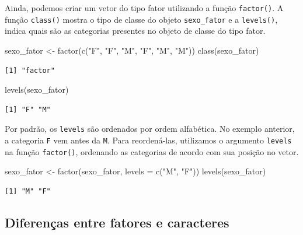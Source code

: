 \documentclass[
  brazilian,
]{book}
\newenvironment{Shaded}{\begin{snugshade}}{\end{snugshade}}
\newcommand{\AttributeTok}[1]{\textcolor[rgb]{0.77,0.63,0.00}{#1}}
\newcommand{\FunctionTok}[1]{\textcolor[rgb]{0.00,0.00,0.00}{#1}}
\newcommand{\NormalTok}[1]{#1}
\newcommand{\OtherTok}[1]{\textcolor[rgb]{0.56,0.35,0.01}{#1}}
\newcommand{\StringTok}[1]{\textcolor[rgb]{0.31,0.60,0.02}{#1}}
\begin{document}
Ainda, podemos criar um vetor do tipo fator utilizando a função \texttt{factor()}. A função \texttt{class()} mostra o tipo de classe do objeto \texttt{sexo\_fator} e a \texttt{levels()}, indica quais são as categorias presentes no objeto de classe do tipo fator.

\begin{Shaded}
\begin{Highlighting}[]
\NormalTok{sexo\_fator }\OtherTok{\textless{}{-}} \FunctionTok{factor}\NormalTok{(}\FunctionTok{c}\NormalTok{(}\StringTok{"F"}\NormalTok{, }\StringTok{"F"}\NormalTok{, }\StringTok{"M"}\NormalTok{, }\StringTok{"F"}\NormalTok{, }\StringTok{"M"}\NormalTok{, }\StringTok{"M"}\NormalTok{))}
\FunctionTok{class}\NormalTok{(sexo\_fator)}
\end{Highlighting}
\end{Shaded}

\begin{verbatim}
[1] "factor"
\end{verbatim}

\begin{Shaded}
\begin{Highlighting}[]
\FunctionTok{levels}\NormalTok{(sexo\_fator)}
\end{Highlighting}
\end{Shaded}

\begin{verbatim}
[1] "F" "M"
\end{verbatim}

Por padrão, os \texttt{levels} são ordenados por ordem alfabética. No exemplo anterior, a categoria \texttt{F} vem antes da \texttt{M}. Para reordená-las, utilizamos o argumento \texttt{levels} na função \texttt{factor()}, ordenando as categorias de acordo com sua posição no vetor.

\begin{Shaded}
\begin{Highlighting}[]
\NormalTok{sexo\_fator }\OtherTok{\textless{}{-}} \FunctionTok{factor}\NormalTok{(sexo\_fator, }\AttributeTok{levels =} \FunctionTok{c}\NormalTok{(}\StringTok{"M"}\NormalTok{, }\StringTok{"F"}\NormalTok{))}
\FunctionTok{levels}\NormalTok{(sexo\_fator)}
\end{Highlighting}
\end{Shaded}

\begin{verbatim}
[1] "M" "F"
\end{verbatim}

\hypertarget{diferenuxe7as-entre-fatores-e-caracteres}{%
\subsection{Diferenças entre fatores e caracteres}\label{diferenuxe7as-entre-fatores-e-caracteres}}
\end{document}
